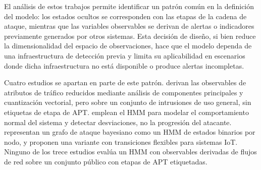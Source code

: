 El análisis de estos trabajos permite identificar un patrón común en la definición del modelo: los estados ocultos se corresponden con las etapas de la cadena de ataque, mientras que las variables observables se derivan de alertas o indicadores previamente generados por otros sistemas. Esta decisión de diseño, si bien reduce la dimensionalidad del espacio de observaciones, hace que el modelo dependa de una infraestructura de detección previa y limita su aplicabilidad en escenarios donde dicha infraestructura no está disponible o produce alertas incompletas.

Cuatro estudios se apartan en parte de este patrón. \textcite{zegeye_multi-layer_2019} derivan las observables de atributos de tráfico reducidos mediante análisis de componentes principales y cuantización vectorial, pero sobre un conjunto de intrusiones de uso general, sin etiquetas de etapa de APT. \textcite{ma_anomaly_2024} emplean el HMM para modelar el comportamiento normal del sistema y detectar desviaciones, no la progresión del atacante. \textcite{kazeminajafabadi_optimal_2023} representan un grafo de ataque bayesiano como un HMM de estados binarios por nodo, y \textcite{kumar_hlpmmgrsphtru_2026} proponen una variante con transiciones flexibles para sistemas IoT. Ninguno de los trece estudios evalúa un HMM con observables derivadas de flujos de red sobre un conjunto público con etapas de APT etiquetadas.

